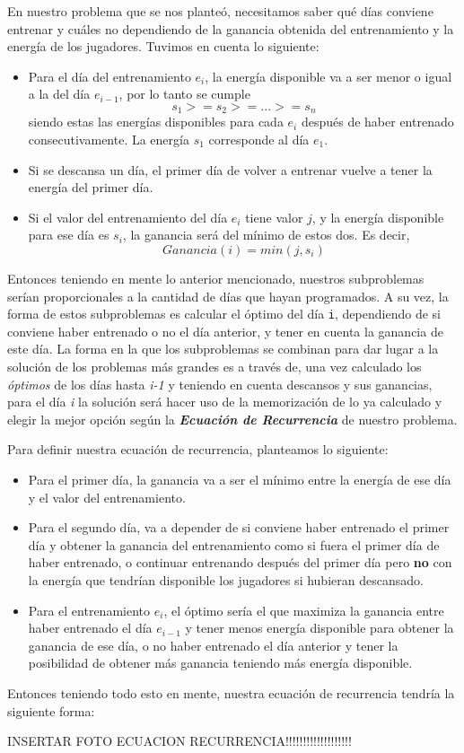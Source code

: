En nuestro problema que se nos planteó, necesitamos saber qué días conviene entrenar y cuáles no dependiendo de la ganancia obtenida del entrenamiento y la energía de los jugadores. Tuvimos en cuenta lo siguiente:
\begin{itemize}
    \item Para el día del entrenamiento $e_i$, la energía disponible va a ser menor o igual a la del día $e_{i-1}$, por lo tanto se cumple
    \[ s_1 >= s_2 >= ... >= s_n \]
    siendo estas las energías disponibles para cada $e_i$ después de haber entrenado consecutivamente. La energía $s_1$ corresponde al día $e_1$.
    \item Si se descansa un día, el primer día de volver a entrenar vuelve a tener la energía del primer día.
    \item Si el valor del entrenamiento del día $e_i$ tiene valor $j$, y la energía disponible para ese día es $s_i$, la ganancia será del mínimo de estos dos. Es decir,
    \[ Ganancia(i) = min(j, s_i) \]
\end{itemize}
Entonces teniendo en mente lo anterior mencionado, nuestros subproblemas serían proporcionales a la cantidad de días que hayan programados. A su vez, la forma de estos subproblemas es calcular el óptimo del día \texttt{i}, dependiendo de si conviene haber entrenado o no el día anterior, y tener en cuenta la ganancia de este día. La forma en la que los subproblemas se combinan para dar lugar a la solución de los problemas más grandes es a través de, una vez calculado los \textit{óptimos} de los días hasta \textit{i-1} y teniendo en cuenta descansos y sus ganancias, para el día \textit{i} la solución será hacer uso de la memorización de lo ya calculado y elegir la mejor opción según la \textbf{\textit{Ecuación de Recurrencia}} de nuestro problema.

Para definir nuestra ecuación de recurrencia, planteamos lo siguiente:
\begin{itemize}
    \item Para el primer día, la ganancia va a ser el mínimo entre la energía de ese día y el valor del entrenamiento.
    \item Para el segundo día, va a depender de si conviene haber entrenado el primer día y obtener la ganancia del entrenamiento como si fuera el primer día de haber entrenado, o continuar entrenando después del primer día pero \textbf{no} con la energía que tendrían disponible los jugadores si hubieran descansado.
    \item Para el entrenamiento $e_i$, el óptimo sería el que maximiza la ganancia entre haber entrenado el día $e_{i-1}$ y tener menos energía disponible para obtener la ganancia de ese día, o no haber entrenado el día anterior y tener la posibilidad de obtener más ganancia teniendo más energía disponible.
\end{itemize}
Entonces teniendo todo esto en mente, nuestra ecuación de recurrencia tendría la siguiente forma:

INSERTAR FOTO ECUACION RECURRENCIA!!!!!!!!!!!!!!!!!!!

